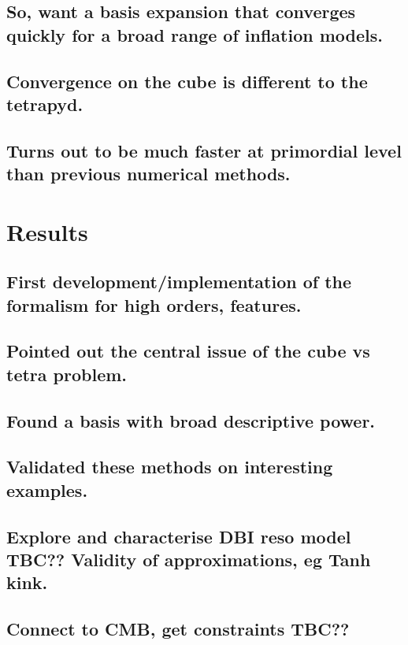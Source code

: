     \subsection{So, want a basis expansion that converges quickly for a broad range of inflation models.}
    \subsection{Convergence on the cube is different to the tetrapyd.}
    \subsection{Turns out to be much faster at primordial level than previous numerical methods.}
\section{Results}
    \subsection{First development/implementation of the formalism for high orders, features.}
    \subsection{Pointed out the central issue of the cube vs tetra problem.}
    \subsection{Found a basis with broad descriptive power.}
    \subsection{Validated these methods on interesting examples.}
    \subsection{Explore and characterise DBI reso model TBC?? Validity of approximations, eg Tanh kink.}
    \subsection{Connect to CMB, get constraints TBC??}

